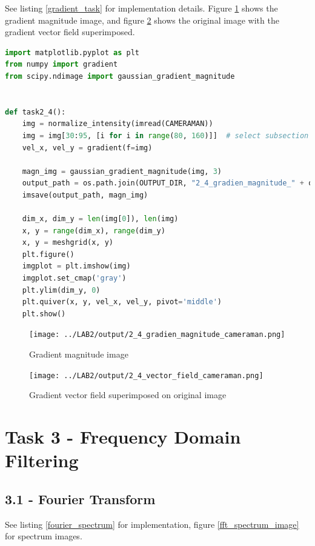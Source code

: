See listing \ref{gradient_task} for implementation details. Figure \ref{gradient_magnitude_image} shows the gradient magnitude image, and figure \ref{gradient_vector_field_image} shows the original image with the gradient vector field superimposed.

\begin{lstlisting}[language=Python, label=gradient_task, caption=Gradient]
import matplotlib.pyplot as plt
from numpy import gradient
from scipy.ndimage import gaussian_gradient_magnitude


def task2_4():
    img = normalize_intensity(imread(CAMERAMAN))
    img = img[30:95, [i for i in range(80, 160)]]  # select subsection of image
    vel_x, vel_y = gradient(f=img)

    magn_img = gaussian_gradient_magnitude(img, 3)
    output_path = os.path.join(OUTPUT_DIR, "2_4_gradien_magnitude_" + os.path.split(CAMERAMAN)[-1])
    imsave(output_path, magn_img)

    dim_x, dim_y = len(img[0]), len(img)
    x, y = range(dim_x), range(dim_y)
    x, y = meshgrid(x, y)
    plt.figure()
    imgplot = plt.imshow(img)
    imgplot.set_cmap('gray')
    plt.ylim(dim_y, 0)
    plt.quiver(x, y, vel_x, vel_y, pivot='middle')
    plt.show()
\end{lstlisting}

\begin{figure}[h!]
    \centering
    \texttt{[image: ../LAB2/output/2\_4\_gradien\_magnitude\_cameraman.png]}
    \caption{Gradient magnitude image}
    \label{gradient_magnitude_image}
\end{figure}

\newpage
\begin{figure}[h!]
    \centering
    \texttt{[image: ../LAB2/output/2\_4\_vector\_field\_cameraman.png]}
    \caption{Gradient vector field superimposed on original image}
    \label{gradient_vector_field_image}
\end{figure}

\newpage
\section*{Task 3 - Frequency Domain Filtering}

\subsection*{3.1 - Fourier Transform}

See listing \ref{fourier_spectrum} for implementation, figure \ref{fft_spectrum_image} for spectrum images.

